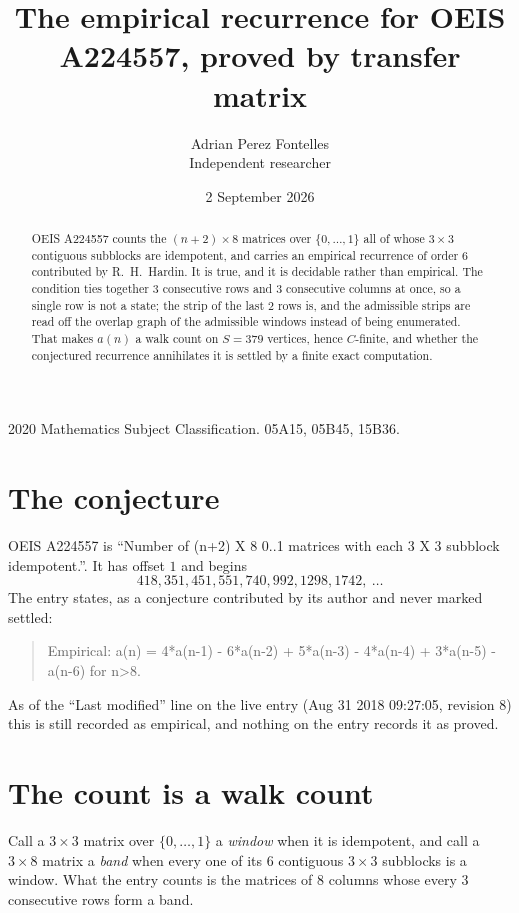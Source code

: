 \documentclass[11pt,a4paper]{article}
\title{The empirical recurrence for OEIS A224557, proved by transfer matrix}
\author{Adrian Perez Fontelles\\ \small Independent researcher}
\date{2 September 2026}
\theoremstyle{plain}
\theoremstyle{definition}
\begin{document}
\maketitle

\begin{abstract}
OEIS A224557 counts the $(n+2)\times8$ matrices over $\{0,\dots,1\}$ all of whose
$3\times3$ contiguous subblocks are idempotent, and carries an empirical recurrence of order
$6$ contributed by R.~H.~Hardin. It is true, and it is decidable rather than empirical.
The condition ties together $3$ consecutive rows and $3$ consecutive columns at once, so a
single row is not a state; the strip of the last $2$ rows is, and the admissible strips
are read off the overlap graph of the admissible windows instead of being enumerated. That
makes $a(n)$ a walk count on $S=379$ vertices, hence $C$-finite, and whether the conjectured
recurrence annihilates it is settled by a finite exact computation.
\end{abstract}

\noindent\small 2020 Mathematics Subject Classification. 05A15, 05B45, 15B36.\normalsize

\section{The conjecture}

OEIS A224557 is ``Number of (n+2) X 8 0..1 matrices with each 3 X 3 subblock idempotent.''. It has offset $1$ and begins
\[
418, 351, 451, 551, 740, 992, 1298, 1742,\ \dots
\]
The entry states, as a conjecture contributed by its author and never marked settled:
\begin{quote}
Empirical: a(n) = 4*a(n-1) - 6*a(n-2) + 5*a(n-3) - 4*a(n-4) + 3*a(n-5) - a(n-6) for n>8.
\end{quote}
As of the ``Last modified'' line on the live entry (Aug 31 2018 09:27:05, revision 8) this is still
recorded as empirical, and nothing on the entry records it as proved.

\section{The count is a walk count}

Call a $3\times3$ matrix over $\{0,\dots,1\}$ a \emph{window} when it is idempotent, and
call a $3\times8$ matrix a \emph{band} when every one of its $6$ contiguous
$3\times3$ subblocks is a window. What the entry counts is the matrices of $8$ columns
whose every $3$ consecutive rows form a band.
\end{document}
